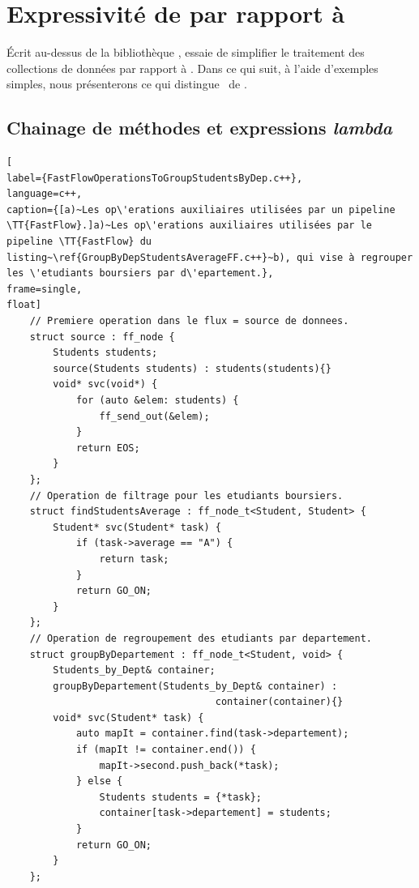 \section{Expressivit\'e de  par rapport à }

\label{PpFfExpressivities.sect}

\'Ecrit au-dessus de la biblioth\`eque ,  essaie de simplifier le traitement des collections de donn\'ees par rapport à . Dans ce qui suit, à l'aide d'exemples simples, nous pr\'esenterons ce qui distingue \ppff\ de .



\subsection*{Chainage de m\'ethodes et expressions \emph{lambda}}

\begin{lstlisting}[
label={FastFlowOperationsToGroupStudentsByDep.c++},
language=c++,
caption={[a)~Les op\'erations auxiliaires utilisées par un pipeline \TT{FastFlow}.]a)~Les op\'erations auxiliaires utilisées par le pipeline \TT{FastFlow} du listing~\ref{GroupByDepStudentsAverageFF.c++}~b), qui vise à regrouper les \'etudiants boursiers par d\'epartement.},
frame=single,
float]
    // Premiere operation dans le flux = source de donnees.
	struct source : ff_node {
		Students students;
		source(Students students) : students(students){}
		void* svc(void*) {
			for (auto &elem: students) {
				ff_send_out(&elem);
			}	
			return EOS;	
		}
	};
	// Operation de filtrage pour les etudiants boursiers.
	struct findStudentsAverage : ff_node_t<Student, Student> {
		Student* svc(Student* task) {
			if (task->average == "A") {
				return task;
			}
			return GO_ON;
		}
	};
	// Operation de regroupement des etudiants par departement.
	struct groupByDepartement : ff_node_t<Student, void> {
		Students_by_Dept& container;
		groupByDepartement(Students_by_Dept& container) :
									container(container){}
		void* svc(Student* task) {
			auto mapIt = container.find(task->departement);
			if (mapIt != container.end()) {
				mapIt->second.push_back(*task);
			} else {
				Students students = {*task};
				container[task->departement] = students;
			}
			return GO_ON;		
		}
	};      
\end{lstlisting}


\addtocounter{lstlisting}{-1}

